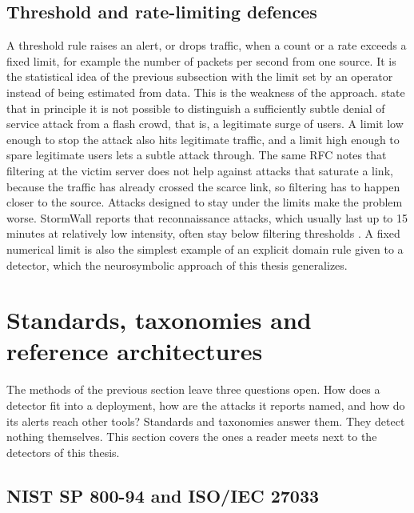 \subsection{Threshold and rate-limiting defences}
\label{sec:threshold-rate-limiting}

A threshold rule raises an alert, or drops traffic, when a count or a rate
exceeds a fixed limit, for example the number of packets per second from one
source. It is the statistical idea of the previous subsection with the limit
set by an operator instead of being estimated from data. This is the
weakness of the approach. \citet{handley2006rfc4732} state that in principle
it is not possible to distinguish a sufficiently subtle denial of service
attack from a flash crowd, that is, a legitimate surge of users. A limit low
enough to stop the attack also hits legitimate traffic, and a limit high
enough to spare legitimate users lets a subtle attack through. The same RFC
notes that filtering at the victim server does not help against attacks that
saturate a link, because the traffic has already crossed the scarce link, so
filtering has to happen closer to the source. Attacks designed to stay under
the limits make the problem worse. StormWall reports that reconnaissance
attacks, which usually last up to 15 minutes at relatively low intensity,
often stay below filtering thresholds \citep{stormwall2026forecast}. A
fixed numerical limit is also the simplest example of an explicit domain
rule given to a detector, which the neurosymbolic approach of this thesis
generalizes.

\section{Standards, taxonomies and reference architectures}
\label{sec:standards-taxonomies}

The methods of the previous section leave three questions open. How does a
detector fit into a deployment, how are the attacks it reports named, and
how do its alerts reach other tools? Standards and taxonomies answer them.
They detect nothing themselves. This section covers the ones a reader meets
next to the detectors of this thesis.

\subsection{NIST SP 800-94 and ISO/IEC 27033}
\label{sec:nist-iso-architectures}


